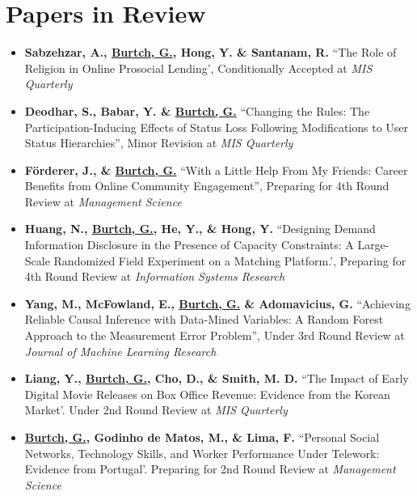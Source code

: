 \documentclass[10.5pt,letterpaper,sans]{moderncv}        %
\begin{document}
\section{Papers in Review}

\begin{itemize}[leftmargin=!,labelindent=5pt,itemindent=-15pt]

\item \textbf{Sabzehzar, A., \underline{Burtch, G.}, Hong, Y. \& Santanam, R.} ``The Role of Religion in Online Prosocial Lending', Conditionally Accepted at \textit{MIS Quarterly}

\item \textbf{Deodhar, S., Babar, Y. \& \underline{Burtch, G.}} ``Changing the Rules: The Participation-Inducing Effects of Status Loss Following Modifications to User Status Hierarchies'', Minor Revision at \textit{MIS Quarterly}

\item \textbf{F{\"o}rderer, J., \& \underline{Burtch, G.}} ``With a Little Help From My Friends: Career Benefits from Online Community Engagement'', Preparing for 4th Round Review at \textit{Management Science}

\item \textbf{Huang, N., \underline{Burtch, G.}, He, Y., \& Hong, Y.} ``Designing Demand Information Disclosure in the Presence of Capacity Constraints: A Large-Scale Randomized Field Experiment on a Matching Platform.', Preparing for 4th Round Review at \textit{Information Systems Research}

\item \textbf{Yang, M., McFowland, E., \underline{Burtch, G.} \& Adomavicius, G.} ``Achieving Reliable Causal Inference with Data-Mined Variables: A Random Forest Approach to the Measurement Error Problem'', Under 3rd Round Review at \textit{Journal of Machine Learning Research}


\item \textbf{Liang, Y., \underline{Burtch, G.}, Cho, D., \& Smith, M. D.} ``The Impact of Early Digital Movie Releases on Box Office Revenue: Evidence from the Korean Market'. Under 2nd Round Review at \textit{MIS Quarterly}

\item \textbf{\underline{Burtch, G.}, Godinho de Matos, M., \& Lima, F.} ``Personal Social Networks, Technology Skills, and Worker Performance Under Telework: Evidence from Portugal'. Preparing for 2nd Round Review at \textit{Management Science}


\end{itemize}
\end{document}
